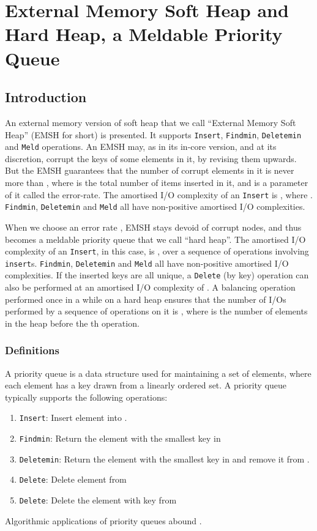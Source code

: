 \chapter{External Memory Soft Heap and Hard Heap, a Meldable Priority Queue}
\label{emsh:chapt}
\section{Introduction}
An external memory version of soft heap that we call ``External Memory Soft Heap''
(EMSH for short) is presented. 
It supports {\tt Insert}, {\tt Findmin}, {\tt Deletemin} and {\tt Meld} operations.
An EMSH may, as in its in-core version, and at its discretion, 
corrupt the keys of some elements in it, by revising them upwards.
But the EMSH guarantees that the number of corrupt elements in it is never more than
, where  is the total number of items inserted in it, and  is
a parameter of it called the error-rate.
The amortised I/O complexity of an {\tt Insert} is 
, where .
{\tt Findmin}, {\tt Deletemin} and {\tt Meld} all have non-positive amortised I/O complexities.

When we choose an error rate , EMSH stays devoid of corrupt nodes, 
and thus becomes a meldable priority queue that we call ``hard heap''.  
The amortised I/O complexity of an {\tt Insert}, in this case, is ,
over a sequence of operations involving  {\tt insert}s.
{\tt Findmin}, {\tt Deletemin} and {\tt Meld} all have non-positive amortised I/O complexities.
If the inserted keys are all unique, a {\tt Delete} (by key) operation can
	also be performed at an amortised I/O complexity of .
A balancing operation performed once in a while on a hard heap 
ensures that the number of I/Os performed by a sequence of  operations on it is
, where
 is the number of elements in the heap before the th operation.

\subsection{Definitions}
A priority queue is a data structure used for maintaining a set  of elements, 
	where each element has a key drawn from a linearly ordered set.
A priority queue typically supports the following operations:
\begin{enumerate}
\item {\tt Insert}: Insert element  into .
\item {\tt Findmin}: Return the element with the smallest key in 
\item {\tt Deletemin}: Return the element with the smallest key in  and remove it from .
\item {\tt Delete}: Delete element  from 
\item {\tt Delete}: Delete the element with key  from 
\end{enumerate}
Algorithmic applications of priority queues abound \cite{AHU74,CLR90}.

